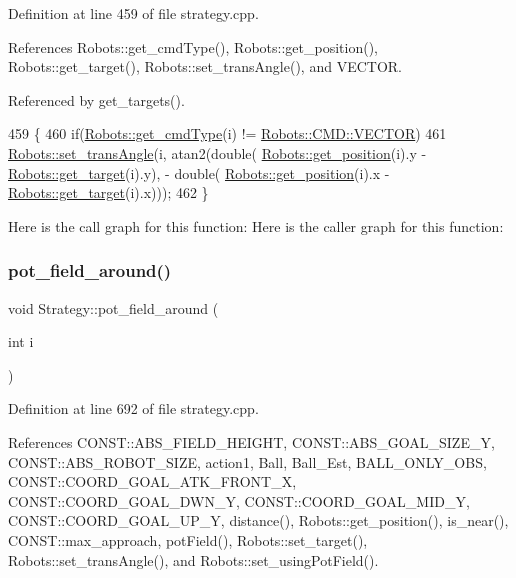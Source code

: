 Definition at line 459 of file strategy.\+cpp.



References Robots\+::get\+\_\+cmd\+Type(), Robots\+::get\+\_\+position(), Robots\+::get\+\_\+target(), Robots\+::set\+\_\+trans\+Angle(), and V\+E\+C\+T\+OR.



Referenced by get\+\_\+targets().


\begin{DoxyCode}
459                                        \{
460     \textcolor{keywordflow}{if}(\hyperlink{class_robots_abc1028ef8481db1426eb5a093c554ac9}{Robots::get\_cmdType}(i) != \hyperlink{serial_w_8hpp_ac6e89954deaa373db52a91ac6db50884}{Robots::CMD::VECTOR})
461         \hyperlink{class_robots_ac18c807efc15557ce996563bb76451ea}{Robots::set\_transAngle}(i, atan2(\textcolor{keywordtype}{double}(
      \hyperlink{class_robots_a1fca8f2f5070176faa6ba1efa2f1ff14}{Robots::get\_position}(i).y - \hyperlink{class_robots_a8a4fe339df4823e45cf34d9fb8daa64b}{Robots::get\_target}(i).y), - \textcolor{keywordtype}{double}(
      \hyperlink{class_robots_a1fca8f2f5070176faa6ba1efa2f1ff14}{Robots::get\_position}(i).x - \hyperlink{class_robots_a8a4fe339df4823e45cf34d9fb8daa64b}{Robots::get\_target}(i).x)));
462 \}
\end{DoxyCode}
Here is the call graph for this function\+:
Here is the caller graph for this function\+:
\mbox{\label{class_strategy_aef2ebe9a76fdb114d547f024e332b3d3}} 
\subsubsection{\texorpdfstring{pot\+\_\+field\+\_\+around()}{pot\_field\_around()}}
{\footnotesize\ttfamily void Strategy\+::pot\+\_\+field\+\_\+around (\begin{DoxyParamCaption}\item[{int}]{i }\end{DoxyParamCaption})}



Definition at line 692 of file strategy.\+cpp.



References C\+O\+N\+S\+T\+::\+A\+B\+S\+\_\+\+F\+I\+E\+L\+D\+\_\+\+H\+E\+I\+G\+HT, C\+O\+N\+S\+T\+::\+A\+B\+S\+\_\+\+G\+O\+A\+L\+\_\+\+S\+I\+Z\+E\+\_\+Y, C\+O\+N\+S\+T\+::\+A\+B\+S\+\_\+\+R\+O\+B\+O\+T\+\_\+\+S\+I\+ZE, action1, Ball, Ball\+\_\+\+Est, B\+A\+L\+L\+\_\+\+O\+N\+L\+Y\+\_\+\+O\+BS, C\+O\+N\+S\+T\+::\+C\+O\+O\+R\+D\+\_\+\+G\+O\+A\+L\+\_\+\+A\+T\+K\+\_\+\+F\+R\+O\+N\+T\+\_\+X, C\+O\+N\+S\+T\+::\+C\+O\+O\+R\+D\+\_\+\+G\+O\+A\+L\+\_\+\+D\+W\+N\+\_\+Y, C\+O\+N\+S\+T\+::\+C\+O\+O\+R\+D\+\_\+\+G\+O\+A\+L\+\_\+\+M\+I\+D\+\_\+Y, C\+O\+N\+S\+T\+::\+C\+O\+O\+R\+D\+\_\+\+G\+O\+A\+L\+\_\+\+U\+P\+\_\+Y, distance(), Robots\+::get\+\_\+position(), is\+\_\+near(), C\+O\+N\+S\+T\+::max\+\_\+approach, pot\+Field(), Robots\+::set\+\_\+target(), Robots\+::set\+\_\+trans\+Angle(), and Robots\+::set\+\_\+using\+Pot\+Field().



